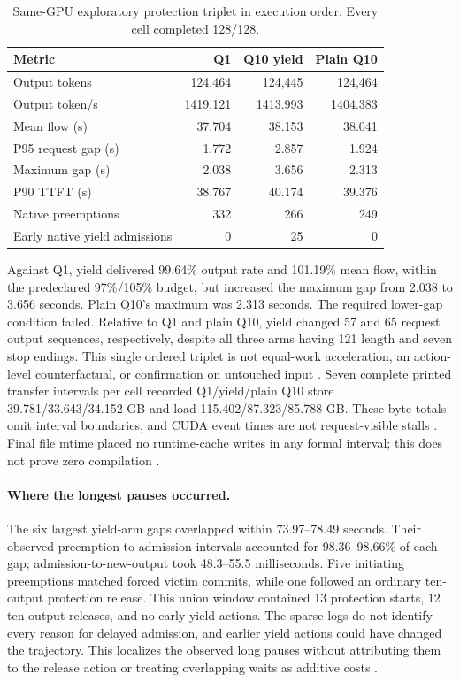 \documentclass[10pt]{article}
\begin{document}
\begin{table}[t]
\centering\small
\caption{Same-GPU exploratory protection triplet in execution order. Every cell completed 128/128.}
\label{tab:yieldtriplet}
\begin{tabular}{lrrr}
\toprule
Metric & Q1 & Q10 yield & Plain Q10 \\
\midrule
Output tokens & 124,464 & 124,445 & 124,464 \\
Output token/s & 1419.121 & 1413.993 & 1404.383 \\
Mean flow (s) & 37.704 & 38.153 & 38.041 \\
P95 request gap (s) & 1.772 & 2.857 & 1.924 \\
Maximum gap (s) & 2.038 & 3.656 & 2.313 \\
P90 TTFT (s) & 38.767 & 40.174 & 39.376 \\
Native preemptions & 332 & 266 & 249 \\
Early native yield admissions & 0 & 25 & 0 \\
\bottomrule
\end{tabular}
\end{table}

Against Q1, yield delivered 99.64\% output rate and 101.19\% mean flow, within the predeclared 97\%/105\% budget, but increased the maximum gap from 2.038 to 3.656 seconds. Plain Q10's maximum was 2.313 seconds. The required lower-gap condition failed. Relative to Q1 and plain Q10, yield changed 57 and 65 request output sequences, respectively, despite all three arms having 121 length and seven stop endings. This single ordered triplet is not equal-work acceleration, an action-level counterfactual, or confirmation on untouched input \cite{yieldtriplet}. Seven complete printed transfer intervals per cell recorded Q1/yield/plain Q10 store 39.781/33.643/34.152 GB and load 115.402/87.323/85.788 GB. These byte totals omit interval boundaries, and CUDA event times are not request-visible stalls \cite{yieldtransfers}. Final file mtime placed no runtime-cache writes in any formal interval; this does not prove zero compilation \cite{yieldtriplet}.

\paragraph{Where the longest pauses occurred.}
The six largest yield-arm gaps overlapped within 73.97--78.49 seconds. Their observed preemption-to-admission intervals accounted for 98.36--98.66\% of each gap; admission-to-new-output took 48.3--55.5 milliseconds. Five initiating preemptions matched forced victim commits, while one followed an ordinary ten-output protection release. This union window contained 13 protection starts, 12 ten-output releases, and no early-yield actions. The sparse logs do not identify every reason for delayed admission, and earlier yield actions could have changed the trajectory. This localizes the observed long pauses without attributing them to the release action or treating overlapping waits as additive costs \cite{yieldpeer}.
\end{document}
